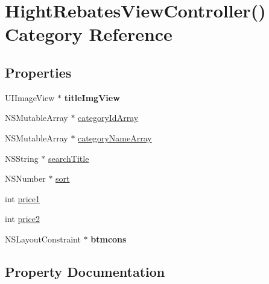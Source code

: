 \hypertarget{category_hight_rebates_view_controller_07_08}{}\section{Hight\+Rebates\+View\+Controller() Category Reference}
\label{category_hight_rebates_view_controller_07_08}
\subsection*{Properties}
\begin{DoxyCompactItemize}
\item 
\mbox{\label{category_hight_rebates_view_controller_07_08_ab8e167ceccb1e780a02b544be8a5c528}} 
U\+I\+Image\+View $\ast$ {\bfseries title\+Img\+View}
\item 
N\+S\+Mutable\+Array $\ast$ \mbox{\hyperlink{category_hight_rebates_view_controller_07_08_abdbb00f1b3dc457ae3095247669ca026}{category\+Id\+Array}}
\item 
N\+S\+Mutable\+Array $\ast$ \mbox{\hyperlink{category_hight_rebates_view_controller_07_08_a31828485de5bf64deb85a62f4044ad23}{category\+Name\+Array}}
\item 
N\+S\+String $\ast$ \mbox{\hyperlink{category_hight_rebates_view_controller_07_08_ab8be0026524e79505e48794c6ab352cc}{search\+Title}}
\item 
N\+S\+Number $\ast$ \mbox{\hyperlink{category_hight_rebates_view_controller_07_08_ab75639a81f439b58da6ea30f8f7367ff}{sort}}
\item 
int \mbox{\hyperlink{category_hight_rebates_view_controller_07_08_a102a1bd4e82b8faca6fdfa74b2833c86}{price1}}
\item 
int \mbox{\hyperlink{category_hight_rebates_view_controller_07_08_accae1244fe339fdb4ad48070c8a1c411}{price2}}
\item 
\mbox{\label{category_hight_rebates_view_controller_07_08_a30694fdde1ecb4a104c17b82d40b6baa}} 
N\+S\+Layout\+Constraint $\ast$ {\bfseries btmcons}
\end{DoxyCompactItemize}


\subsection{Property Documentation}
\mbox{\label{category_hight_rebates_view_controller_07_08_abdbb00f1b3dc457ae3095247669ca026}} 
